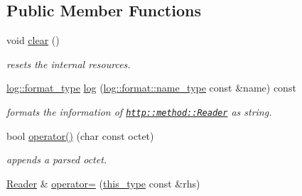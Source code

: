 \subsection*{Public Member Functions}
\begin{DoxyCompactItemize}
\item 
\hypertarget{classhryky_1_1http_1_1method_1_1_reader_ab09eca2747fad07619bc0d956bbca1c9}{void \hyperlink{classhryky_1_1http_1_1method_1_1_reader_ab09eca2747fad07619bc0d956bbca1c9}{clear} ()}\label{classhryky_1_1http_1_1method_1_1_reader_ab09eca2747fad07619bc0d956bbca1c9}

\begin{DoxyCompactList}\small\item\em resets the internal resources. \end{DoxyCompactList}\item 
\hypertarget{classhryky_1_1http_1_1method_1_1_reader_ada196a52c4a8951bf2052d25d2ac6786}{\hyperlink{namespacehryky_1_1log_ad50448c3f934f1eacd5c1bcffe8111e1}{log\-::format\-\_\-type} \hyperlink{classhryky_1_1http_1_1method_1_1_reader_ada196a52c4a8951bf2052d25d2ac6786}{log} (\hyperlink{namespacehryky_1_1log_1_1format_ab7408d1e2ed2d648dbf9bba69eb74288}{log\-::format\-::name\-\_\-type} const \&name) const }\label{classhryky_1_1http_1_1method_1_1_reader_ada196a52c4a8951bf2052d25d2ac6786}

\begin{DoxyCompactList}\small\item\em formats the information of \href{http::method::Reader}{\tt http\-::method\-::\-Reader} as string. \end{DoxyCompactList}\item 
\hypertarget{classhryky_1_1http_1_1method_1_1_reader_a1d531ef61c2ccfbec68374fd8a7d54d2}{bool \hyperlink{classhryky_1_1http_1_1method_1_1_reader_a1d531ef61c2ccfbec68374fd8a7d54d2}{operator()} (char const octet)}\label{classhryky_1_1http_1_1method_1_1_reader_a1d531ef61c2ccfbec68374fd8a7d54d2}

\begin{DoxyCompactList}\small\item\em appends a parsed octet. \end{DoxyCompactList}\item 
\hypertarget{classhryky_1_1http_1_1method_1_1_reader_a40d2f84d32a43a99ecf668409aef105c}{\hyperlink{classhryky_1_1http_1_1method_1_1_reader}{Reader} \& \hyperlink{classhryky_1_1http_1_1method_1_1_reader_a40d2f84d32a43a99ecf668409aef105c}{operator=} (\hyperlink{classhryky_1_1http_1_1method_1_1_reader_acbfb161bac6c8d7c1eacb754150061a1}{this\-\_\-type} const \&rhs)}\label{classhryky_1_1http_1_1method_1_1_reader_a40d2f84d32a43a99ecf668409aef105c}


\end{DoxyCompactItemize}
